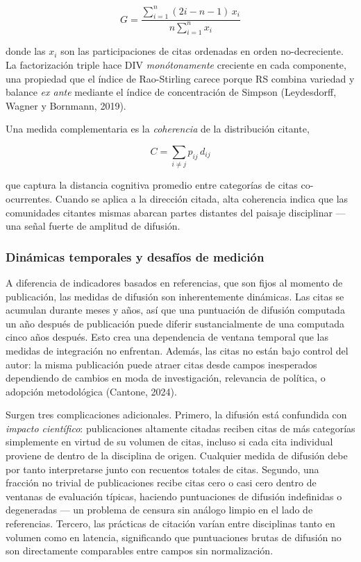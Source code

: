 \documentclass[
]{article}
\begin{document}
\[G = \frac{\displaystyle\sum_{i=1}^{n}(2i - n - 1)\,x_i}
          {n\displaystyle\sum_{i=1}^{n} x_i}\]

donde las \(x_i\) son las participaciones de citas ordenadas en orden
no-decreciente. La factorización triple hace DIV \emph{monótonamente}
creciente en cada componente, una propiedad que el índice de
Rao-Stirling carece porque RS combina variedad y balance \emph{ex ante}
mediante el índice de concentración de Simpson (Leydesdorff, Wagner y
Bornmann, 2019).

Una medida complementaria es la \emph{coherencia} de la distribución
citante,

\[C = \sum_{i \neq j} p_{ij}\,d_{ij}\]

que captura la distancia cognitiva promedio entre categorías de citas
co-ocurrentes. Cuando se aplica a la dirección citada, alta coherencia
indica que las comunidades citantes mismas abarcan partes distantes del
paisaje disciplinar --- una señal fuerte de amplitud de difusión.

\hypertarget{dinuxe1micas-temporales-y-desafuxedos-de-mediciuxf3n}{%
\subsubsection{Dinámicas temporales y desafíos de
medición}\label{dinuxe1micas-temporales-y-desafuxedos-de-mediciuxf3n}}

A diferencia de indicadores basados en referencias, que son fijos al
momento de publicación, las medidas de difusión son inherentemente
dinámicas. Las citas se acumulan durante meses y años, así que una
puntuación de difusión computada un año después de publicación puede
diferir sustancialmente de una computada cinco años después. Esto crea
una dependencia de ventana temporal que las medidas de integración no
enfrentan. Además, las citas no están bajo control del autor: la misma
publicación puede atraer citas desde campos inesperados dependiendo de
cambios en moda de investigación, relevancia de política, o adopción
metodológica (Cantone, 2024).

Surgen tres complicaciones adicionales. Primero, la difusión está
confundida con \emph{impacto científico}: publicaciones altamente
citadas reciben citas de más categorías simplemente en virtud de su
volumen de citas, incluso si cada cita individual proviene de dentro de
la disciplina de origen. Cualquier medida de difusión debe por tanto
interpretarse junto con recuentos totales de citas. Segundo, una
fracción no trivial de publicaciones recibe citas cero o casi cero
dentro de ventanas de evaluación típicas, haciendo puntuaciones de
difusión indefinidas o degeneradas --- un problema de censura sin
análogo limpio en el lado de referencias. Tercero, las prácticas de
citación varían entre disciplinas tanto en volumen como en latencia,
significando que puntuaciones brutas de difusión no son directamente
comparables entre campos sin normalización.
\end{document}
